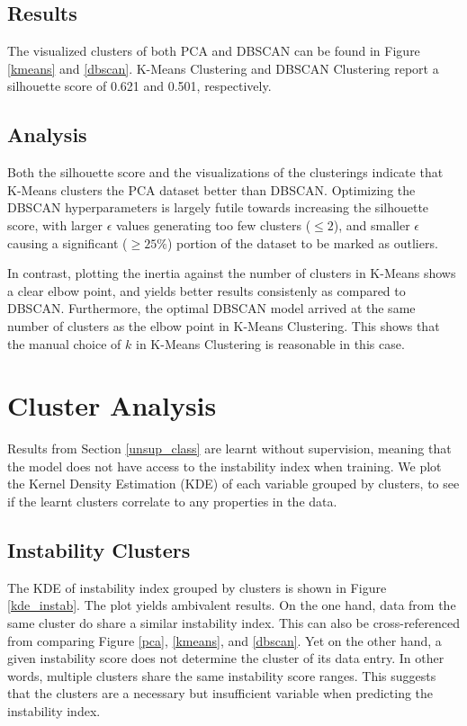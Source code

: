 \documentclass[twocolumn]{article}
\begin{document}
\subsection{Results}
The visualized clusters of both PCA and DBSCAN can be found in Figure \ref{kmeans} and \ref{dbscan}. K-Means Clustering and DBSCAN Clustering report a silhouette score of 0.621 and 0.501, respectively.
\subsection{Analysis}
Both the silhouette score and the visualizations of the clusterings indicate that K-Means clusters the PCA dataset better than DBSCAN. Optimizing the DBSCAN hyperparameters is largely futile towards increasing the silhouette score, with larger $\epsilon$ values generating too few clusters ($\leq  2$), and smaller $\epsilon$ causing a significant ($\geq 25 \%$) portion of the dataset to be marked as outliers.

In contrast, plotting the inertia against the number of clusters in K-Means shows a clear elbow point, and yields better results consistenly as compared to DBSCAN. Furthermore, the optimal DBSCAN model arrived at the same number of clusters as the elbow point in K-Means Clustering. This shows that the manual choice of $k$ in K-Means Clustering is reasonable in this case.

\section{Cluster Analysis}
Results from Section \ref{unsup_class} are learnt without supervision, meaning that the model does not have access to the instability index when training. We plot the Kernel Density Estimation (KDE) of each variable grouped by clusters, to see if the learnt clusters correlate to any properties in the data.
\subsection{Instability Clusters}
The KDE of instability index grouped by clusters is shown in Figure \ref{kde_instab}. The plot yields ambivalent results. On the one hand, data from the same cluster do share a similar instability index. This can also be cross-referenced from comparing Figure \ref{pca}, \ref{kmeans}, and \ref{dbscan}. Yet on the other hand, a given instability score does not determine the cluster of its data entry. In other words, multiple clusters share the same instability score ranges. This suggests that the clusters are a necessary but insufficient variable when predicting the instability index.
\end{document}

